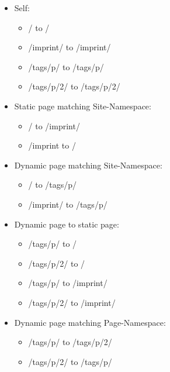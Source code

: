 \begin{itemize}
  \item Self:
    \begin{itemize}
      \item / to /
      \item /imprint/ to /imprint/
      \item /tags/p/ to /tags/p/
      \item /tags/p/2/ to /tags/p/2/
    \end{itemize}
  \item Static page matching Site-Namespace:
    \begin{itemize}
      \item / to /imprint/
      \item /imprint to /
    \end{itemize}
  \item Dynamic page matching Site-Namespace:
    \begin{itemize}
      \item / to /tags/p/
      \item /imprint/ to /tags/p/
    \end{itemize}
  \item Dynamic page to static page:
    \begin{itemize}
      \item /tags/p/ to /
      \item /tags/p/2/ to /
      \item /tags/p/ to /imprint/
      \item /tags/p/2/ to /imprint/
    \end{itemize}
  \item Dynamic page matching Page-Namespace:
    \begin{itemize}
      \item /tags/p/ to /tags/p/2/
      \item /tags/p/2/ to /tags/p/
    \end{itemize}
\end{itemize}

